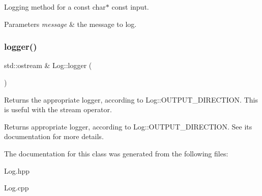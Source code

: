 Logging method for a const char$\ast$ const input. 
\begin{DoxyParams}{Parameters}
{\em message} & the message to log. \\
\hline
\end{DoxyParams}
\hypertarget{classLog_a32d048a4924c7851c4b7b16758675af6}{}\label{classLog_a32d048a4924c7851c4b7b16758675af6} 
\subsubsection{\texorpdfstring{logger()}{logger()}}
{\ttfamily std\+::ostream \& Log\+::logger (\begin{DoxyParamCaption}{ }\end{DoxyParamCaption})}

Returns the appropriate logger, according to Log\+::\+O\+U\+T\+P\+U\+T\+\_\+\+D\+I\+R\+E\+C\+T\+I\+ON. This is useful with the stream operator. \begin{DoxyReturn}{Returns}
appropriate logger, according to Log\+::\+O\+U\+T\+P\+U\+T\+\_\+\+D\+I\+R\+E\+C\+T\+I\+ON. See its documentation for more details. 
\end{DoxyReturn}


The documentation for this class was generated from the following files\+:\begin{DoxyCompactItemize}
\item 
Log.\+hpp\item 
Log.\+cpp\end{DoxyCompactItemize}
